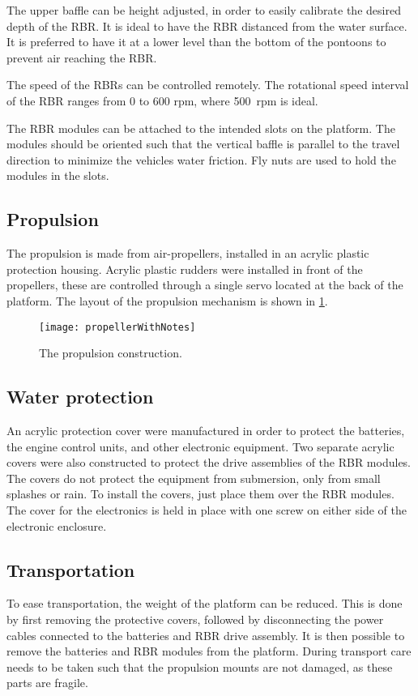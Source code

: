 The upper baffle can be height adjusted, in order to easily calibrate the desired depth of the RBR. It is ideal to have the RBR distanced from the water surface. It is preferred to have it at a lower level than the bottom of the pontoons to prevent air reaching the RBR. 

The speed of the RBRs can be controlled remotely. The rotational speed interval of the RBR ranges from 0 to 600 rpm, where 500~rpm is ideal.


The RBR modules can be attached to the intended slots on the platform. The modules should be oriented such that the vertical baffle is parallel to the travel direction to minimize the vehicles water friction. Fly nuts are used to hold the modules in the slots. 

\subsection{Propulsion}
The propulsion is made from air-propellers, installed in an acrylic plastic protection housing. Acrylic plastic rudders were installed in front of the propellers, these are controlled through a single servo located at the back of the platform. The layout of the propulsion mechanism is shown in \cref{fig:propellerWithNotes}.

\begin{figure}[h]
   \centering
   \texttt{[image: propellerWithNotes]}
   \caption{The propulsion construction.}
   \label{fig:propellerWithNotes}
\end{figure}

\subsection{Water protection}

An acrylic protection cover were manufactured in order to protect the batteries, the engine control units, and other electronic equipment. Two separate acrylic covers were also constructed to protect the drive assemblies of the RBR modules. The covers do not protect the equipment from submersion, only from small splashes or rain. To install the covers, just place them over the RBR modules. The cover for the electronics is held in place with one screw on either side of the electronic enclosure.

\subsection{Transportation}

To ease transportation, the weight of the platform can be reduced. This is done by first removing the protective covers, followed by disconnecting the power cables connected to the batteries and RBR drive assembly. It is then possible to remove the batteries and RBR modules from the platform. During transport care needs to be taken such that the propulsion mounts are not damaged, as these parts are fragile.